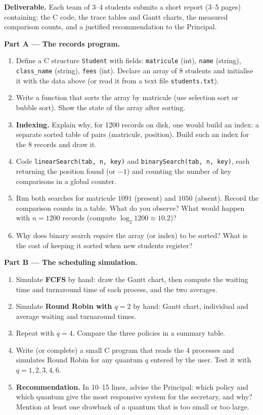 \documentclass[11pt]{article}
\newcommand{\cle}[1]{{\popxbold\color{popdark}#1}}
\newcounter{popsec}
\newcounter{popsub}
\newcommand{\courssub}[1]{%
  \stepcounter{popsub}%
  \par\vspace{9pt}\noindent{\popxbold\fontsize{11.5}{13}\selectfont\color{popink}{\color{poporange}\thepopsec.\thepopsub}\hspace{6pt}#1}\par\nopagebreak\vspace{4pt}
}
\begin{document}
\textbf{Deliverable.} Each team of 3--4 students submits a short report (3--5 pages) containing: the C code, the trace tables and Gantt charts, the measured comparison counts, and a justified recommendation to the Principal.

\courssub{Tasks}

\textbf{Part A --- The records program.}

\begin{enumerate}
\item Define a C structure \texttt{Student} with fields: \texttt{matricule} (int), \texttt{name} (string), \texttt{class\_name} (string), \texttt{fees} (int). Declare an array of 8 students and initialise it with the data above (or read it from a text file \texttt{students.txt}).
\item Write a function that sorts the array by matricule (use selection sort or bubble sort). Show the state of the array after sorting.
\item \textbf{Indexing.} Explain why, for 1200 records on disk, one would build an \cle{index}: a separate sorted table of pairs (matricule, position). Build such an index for the 8 records and draw it.
\item Code \texttt{linearSearch(tab, n, key)} and \texttt{binarySearch(tab, n, key)}, each returning the position found (or $-1$) and counting the number of key comparisons in a global counter.
\item Run both searches for matricule $1091$ (present) and $1050$ (absent). Record the comparison counts in a table. What do you observe? What would happen with $n = 1200$ records (compute $\log_2 1200 \approx 10.2$)?
\item Why does binary search \emph{require} the array (or index) to be sorted? What is the cost of keeping it sorted when new students register?
\end{enumerate}

\textbf{Part B --- The scheduling simulation.}

\begin{enumerate}
\item[7.] Simulate \textbf{FCFS} by hand: draw the Gantt chart, then compute the waiting time and turnaround time of each process, and the two averages.
\item[8.] Simulate \textbf{Round Robin with $q = 2$} by hand: Gantt chart, individual and average waiting and turnaround times.
\item[9.] Repeat with \textbf{$q = 4$}. Compare the three policies in a summary table.
\item[10.] Write (or complete) a small C program that reads the 4 processes and simulates Round Robin for any quantum $q$ entered by the user. Test it with $q = 1, 2, 3, 4, 6$.
\item[11.] \textbf{Recommendation.} In 10--15 lines, advise the Principal: which policy and which quantum give the most responsive system for the secretary, and why? Mention at least one drawback of a quantum that is too small or too large.
\end{enumerate}
\end{document}
